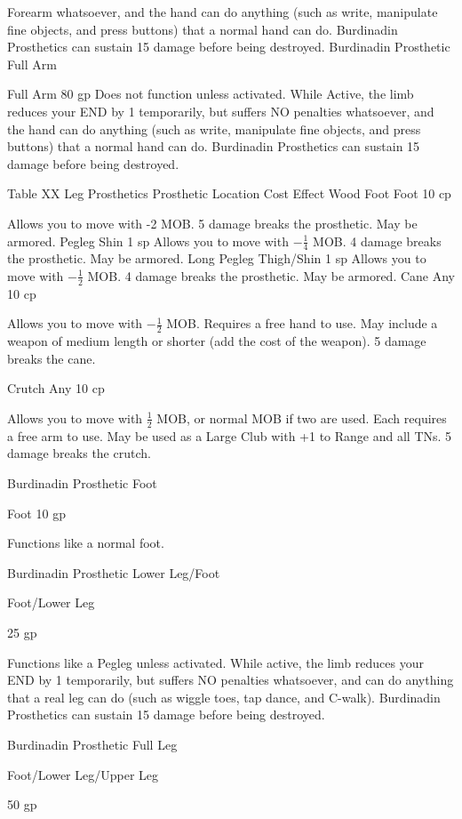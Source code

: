 \documentclass[oneside,11pt,english]{book}
\begin{document}
Forearm whatsoever, and the hand can do anything (such as write, manipulate 
fine objects, and press buttons) that a normal hand can do. Burdinadin 
Prosthetics can sustain 15 damage before being destroyed. 
Burdinadin 
Prosthetic Full 
Arm 

Full Arm 80 gp Does not function unless activated. While Active, the limb reduces 
your END by 1 temporarily, but suffers NO penalties whatsoever, and 
the hand can do anything (such as write, manipulate fine objects, and 
press buttons) that a normal hand can do. Burdinadin Prosthetics can 
sustain 15 damage before being destroyed. 

 
Table XX Leg Prosthetics 
Prosthetic Location Cost Effect 
Wood Foot Foot 10 
cp 

Allows you to move with -2 MOB. 5 damage breaks the prosthetic. 
May be armored. 
Pegleg Shin 1 sp Allows you to move with $ -\frac{1}{4} $ MOB. 4 damage breaks the prosthetic. 
May be armored. 
Long Pegleg Thigh/Shin 1 sp Allows you to move with $ -\frac{1}{2} $ MOB. 4 damage breaks the prosthetic. 
May be armored. 
Cane Any 10 
cp 

Allows you to move with $ -\frac{1}{2} $ MOB. Requires a free hand to use. May 
include a weapon of medium length or shorter (add the cost of the 
weapon). 5 damage breaks the cane. 

Crutch Any 10 
cp 

Allows you to move with $ \frac{1}{2} $ MOB, or normal MOB if two are used. 
Each requires a free arm to use. May be used as a Large Club with +1 to 
Range and all TNs. 5 damage breaks the crutch. 

Burdinadin 
Prosthetic Foot 

Foot 10 
gp 

Functions like a normal foot. 

Burdinadin 
Prosthetic 
Lower Leg/Foot 

Foot/Lower 
Leg 

25 
gp 

Functions like a Pegleg unless activated. While active, the limb reduces 
your END by 1 temporarily, but suffers NO penalties whatsoever, and 
can do anything that a real leg can do (such as wiggle toes, tap dance, 
and C-walk). Burdinadin Prosthetics can sustain 15 damage before 
being destroyed. 

Burdinadin 
Prosthetic Full 
Leg 

Foot/Lower 
Leg/Upper 
Leg 

50 
gp 
\end{document}
